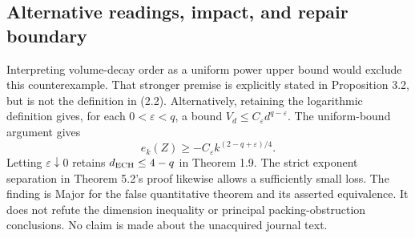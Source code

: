 \documentclass[10pt]{article}
\begin{document}
\subsection*{Alternative readings, impact, and repair boundary}
Interpreting volume-decay order as a uniform power upper bound would exclude this counterexample. That stronger premise is explicitly stated in Proposition 3.2, but is not the definition in (2.2). Alternatively, retaining the logarithmic definition gives, for each \(0<\varepsilon<q\), a bound \(V_d\le C_\varepsilon d^{q-\varepsilon}\). The uniform-bound argument gives \[e_k(Z)\ge-C_\varepsilon k^{(2-q+\varepsilon)/4}.\] Letting \(\varepsilon\downarrow0\) retains \(d_{\rm ECH}\le4-q\) in Theorem 1.9. The strict exponent separation in Theorem 5.2’s proof likewise allows a sufficiently small loss. The finding is Major for the false quantitative theorem and its asserted equivalence. It does not refute the dimension inequality or principal packing-obstruction conclusions. No claim is made about the unacquired journal text.\par
\end{document}
